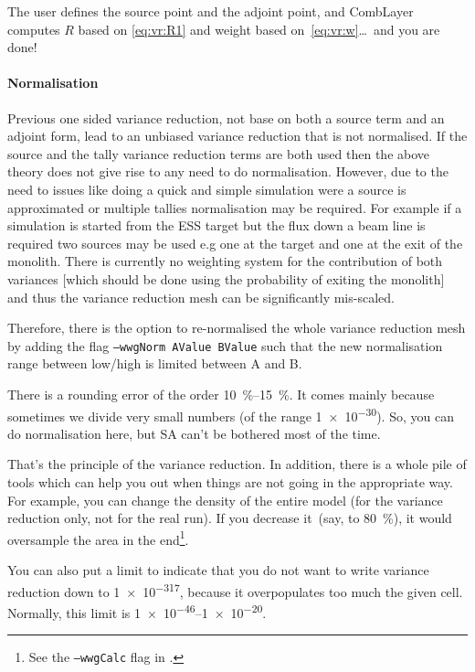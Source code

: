 The user defines the source point and the adjoint point, and CombLayer computes $R$ based on \eqref{eq:vr:R1} and
weight based on~\eqref{eq:vr:w}\dots\ and you are done!

\paragraph{Normalisation}

Previous one sided variance reduction, not base on both a source term
and an adjoint form, lead to an unbiased variance reduction that is
not normalised. If the source and the tally variance reduction terms
are both used then the above theory does not give rise to any need to
do normalisation. However, due to the need to issues like doing a
quick and simple simulation were a source is approximated or multiple
tallies normalisation may be required. For example if a simulation is
started from the ESS target but the flux down a beam line is required
two sources may be used e.g one at the target and one at the exit of
the monolith. There is currently no weighting system for the
contribution of both variances [which should be done using the
  probability of exiting the monolith] and thus the variance reduction
mesh can be significantly mis-scaled.

Therefore, there is the option to re-normalised the whole variance reduction mesh by adding the flag
{\tt --wwgNorm AValue BValue} such that the new normalisation range between low/high is limited between A and B.


There is a rounding error of the order \SIrange{10}{15}{\percent}.
It comes mainly because sometimes we divide very small numbers (of the range \num[retain-unity-mantissa=false]{1e-30}). So, you can do normalisation here, but
SA can't be bothered most of the time.

\bigskip

That's the principle of the variance reduction. In addition, there is a whole pile of tools which can help you out when things
are not going in the appropriate way.
For example, you can change the density of the entire model (for the variance reduction only, not for the real run).
If you decrease it~(say, to \SI{80}{\percent}), it would oversample the area in the end\footnote{See the {\tt --wwgCalc} flag in .}.

You can also put a limit to indicate that you do not want to write variance reduction down to \num[retain-unity-mantissa=false]{1e-317}, because it overpopulates too much the given cell. Normally, this limit is \numrange[retain-unity-mantissa=false]{1e-46}{1e-20}.

